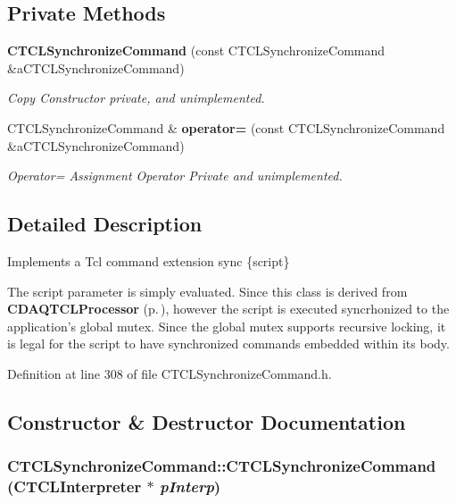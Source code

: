 \subsection*{Private Methods}
\begin{CompactItemize}
\item 
{\bf CTCLSynchronize\-Command} (const CTCLSynchronize\-Command \&a\-CTCLSynchronize\-Command)
\begin{CompactList}\small\item\em Copy Constructor private, and unimplemented.\item\end{CompactList}\item 
CTCLSynchronize\-Command \& {\bf operator=} (const CTCLSynchronize\-Command \&a\-CTCLSynchronize\-Command)
\begin{CompactList}\small\item\em Operator= Assignment Operator Private and unimplemented.\item\end{CompactList}\end{CompactItemize}


\subsection{Detailed Description}
Implements a Tcl command extension sync \{script\}

The script parameter is simply evaluated. Since this class is derived from {\bf CDAQTCLProcessor} {\rm (p.\,\pageref{classCDAQTCLProcessor})}, however the script is executed syncrhonized to the application's global mutex. Since the global mutex supports recursive locking, it is legal for the script to have synchronized commands embedded within its body. 



Definition at line 308 of file CTCLSynchronize\-Command.h.

\subsection{Constructor \& Destructor Documentation}
\subsubsection{\setlength{\rightskip}{0pt plus 5cm}CTCLSynchronize\-Command::CTCLSynchronize\-Command ({\bf CTCLInterpreter} $\ast$ {\em p\-Interp})\hspace{0.3cm}{\tt  [inline]}}\label{classCTCLSynchronizeCommand_a0}


